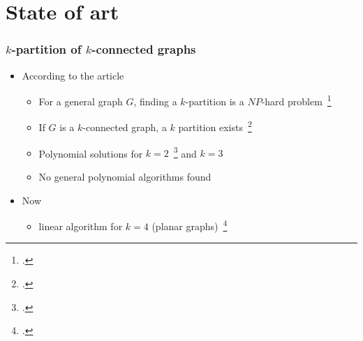 \section{State of art}
%


\begin{frame}
  \frametitle{$k$-partition of $k$-connected graphs}
  \begin{itemize}
  \item According to the article
    \begin{itemize}
    \item For a general graph $G$, finding a $k$-partition is a $NP$-hard
      problem~\footcite{Dyer1985139}
    \item If $G$ is a $k$-connected graph, a $k$ partition exists~\footcite{GE78,LL77}
    \item Polynomial solutions for $k = 2$~\footcite{GE78,LL77} and
      $k = 3$%
    \item No general polynomial algorithms found
    \end{itemize}
  \item Now
    \begin{itemize}
    \item linear algorithm for $k = 4$ (planar graphs)~\footcite{Nakano1997315}
    \end{itemize}
  \end{itemize}
\end{frame}

